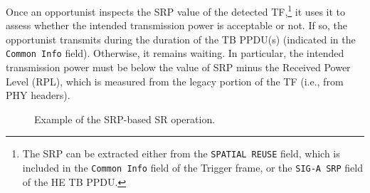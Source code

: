 \documentclass[preprint,12pt]{elsarticle}
\begin{document}
	Once an opportunist inspects the SRP value of the detected TF,\footnote{The SRP can be extracted either from the \texttt{SPATIAL REUSE} field, which is included in the \texttt{Common Info} field of the Trigger frame, or the \texttt{SIG-A SRP} field of the HE TB PPDU.} it uses it to assess whether the intended transmission power is acceptable or not. If so, the opportunist transmits during the duration of the TB PPDU(s) (indicated in the \texttt{Common Info} field). Otherwise, it remains waiting. In particular, the intended transmission power must be below the value of SRP minus the Received Power Level (RPL), which is measured from the legacy portion of the TF (i.e., from PHY headers).
	
	\begin{figure}[ht!]
		\centering
		\hspace{1cm}
		\caption{Example of the SRP-based SR operation.}
		\label{fig:fig_13}
	\end{figure}
%	
	
\end{document}
